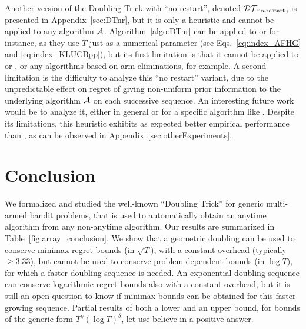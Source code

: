 \documentclass[12pt]{colt2018} %
\begin{document}


Another version of the Doubling Trick with ``no restart'', denoted $\mathcal{DT}_{\text{no-restart}}$, is presented in Appendix~\ref{sec:DTnr}, but it is only a heuristic and cannot be applied to any algorithm $\mathcal{A}$.
Algorithm~\ref{algo:DTnr} can be applied to \KLUCBpp{} or \AFHG{} for instance, as they use $T$ just as a numerical parameter (see Eqs.~\ref{eq:index_AFHG} and \ref{eq:index_KLUCBpp}), but its first limitation is that it cannot be applied to \DMEDp{} \citep{Honda10} or \Exppp{} \citep{Seldin17}, or any algorithms based on arm eliminations, for example.
%
A second limitation is the difficulty to analyze this ``no restart'' variant,
due to the unpredictable effect on regret of giving non-uniform prior information to the underlying algorithm $\mathcal{A}$ on each successive sequence.
An interesting future work would be to analyze it, either in general or for a specific algorithm like \KLUCBpp.
%
Despite its limitations, this heuristic exhibits as expected better empirical performance than \DT, as can be observed in Appendix~\ref{sec:otherExperiments}.

\section{Conclusion}\label{sec:conclusion}


We formalized and studied the well-known ``Doubling Trick'' for generic multi-armed bandit problems, that is used to automatically obtain an anytime algorithm from any non-anytime algorithm. Our results are summarized in Table~\ref{fig:array_conclusion}. We show that a geometric doubling can be used to conserve minimax regret bounds (in $\sqrt{T}$), with a constant overhead (typically $\geq 3.33$),
but cannot be used to conserve problem-dependent bounds (in $\log T$),
for which a faster doubling sequence is needed.
An exponential doubling sequence can conserve logarithmic regret bounds also with a constant overhead,
but it is still an open question to know if minimax bounds can be obtained for this faster growing sequence.
%
Partial results of both a lower and an upper bound, for bounds of the generic form $T^{\gamma} (\log T)^{\delta}$, let use believe in a positive answer.
\end{document}
